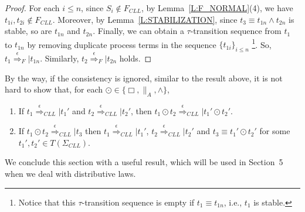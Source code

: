 \documentclass{elsarticle}
\theoremstyle{plain}
\theoremstyle{definition}
\begin{document}
\begin{proof}
     For each $i\leq n$, since $S_i\notin F_{CLL}$, by Lemma~\ref{L:F_NORMAL}(4), we have $t_{1i},t_{2i} \notin F_{CLL}$. Moreover, by Lemma~\ref{L:STABILIZATION}, since $t_3 \equiv t_{1n} \wedge t_{2n}$ is stable, so are $t_{1n}$ and $t_{2n}$. Finally, we can obtain a $\tau$-transition sequence from $t_1$ to $t_{1n}$ by removing duplicate process terms in the sequence $\{t_{1i}\}_{i\leq n}$ \footnote{Notice that this $\tau$-transition sequence is empty if $t_1 \equiv t_{1n}$, i.e., $t_1$ is stable.}.
     So, $t_1 \stackrel{\epsilon}{\Longrightarrow}_F| t_{1n}$.
     Similarly, $t_2 \stackrel{\epsilon}{\Longrightarrow}_F| t_{2n}$ holds.
\end{proof}

By the way, if the consistency is ignored, similar to the result above, it is not hard to show that, for each $\odot \in \{\Box,\parallel_A,\wedge\}$,

\begin{enumerate}
  \item   If $t_1 \stackrel{\epsilon}{\Longrightarrow}_{{CLL}}| t_1'$ and $t_2 \stackrel{\epsilon}{\Longrightarrow}_{{CLL}} |t_2'$, then $t_1 \odot t_2 \stackrel{\epsilon}{\Longrightarrow}_{{CLL}}| t_1' \odot t_2'$.
  \item  If $t_1 \odot t_2 \stackrel{\epsilon}{\Longrightarrow}_{{CLL}}| t_3$ then $t_1 \stackrel{\epsilon}{\Longrightarrow}_{{CLL}}| t_1'$, $t_2 \stackrel{\epsilon}{\Longrightarrow}_{{CLL}} |t_2'$ and $t_3 \equiv t_1' \odot t_2'$ for some $t_1', t_2' \in T(\Sigma_{CLL})$.
\end{enumerate}

We conclude this section with a useful result, which will be used in Section~5 when we deal with distributive laws.
\end{document}
